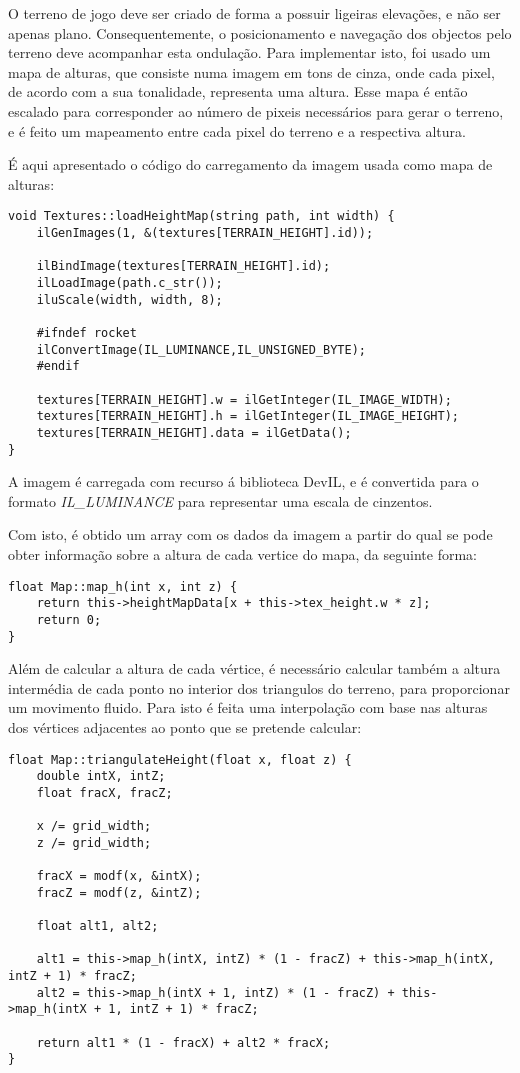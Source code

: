 O terreno de jogo deve ser criado de forma a possuir ligeiras elevações, e não ser apenas plano. Consequentemente, o posicionamento e navegação dos objectos pelo terreno deve acompanhar esta ondulação. Para implementar isto, foi usado um mapa de alturas, que consiste numa imagem em tons de cinza, onde cada pixel, de acordo com a sua tonalidade, representa uma altura.
Esse mapa é então escalado para corresponder ao número de pixeis necessários para gerar o terreno, e é feito um mapeamento entre cada pixel do terreno e a respectiva altura.

É aqui apresentado o código do carregamento da imagem usada como mapa de alturas:

\begin{lstlisting}
void Textures::loadHeightMap(string path, int width) {
	ilGenImages(1, &(textures[TERRAIN_HEIGHT].id));

	ilBindImage(textures[TERRAIN_HEIGHT].id);
	ilLoadImage(path.c_str());
	iluScale(width, width, 8);

	#ifndef rocket
	ilConvertImage(IL_LUMINANCE,IL_UNSIGNED_BYTE);
	#endif
	
	textures[TERRAIN_HEIGHT].w = ilGetInteger(IL_IMAGE_WIDTH);
	textures[TERRAIN_HEIGHT].h = ilGetInteger(IL_IMAGE_HEIGHT);
	textures[TERRAIN_HEIGHT].data = ilGetData();
}
\end{lstlisting}

A imagem é carregada com recurso á biblioteca DevIL, e é convertida para o formato \emph{IL\_LUMINANCE} para representar uma escala de cinzentos.

Com isto, é obtido um array com os dados da imagem a partir do qual se pode obter informação sobre a altura de cada vertice do mapa, da seguinte forma:

\begin{lstlisting}[caption=Função de cálculo da altura de um vértice do mapa]
float Map::map_h(int x, int z) {
	return this->heightMapData[x + this->tex_height.w * z];
	return 0;
}
\end{lstlisting}

Além de calcular a altura de cada vértice, é necessário calcular também a altura intermédia de cada ponto no interior dos triangulos do terreno, para proporcionar um movimento fluido. Para isto é feita uma interpolação com base nas alturas dos vértices adjacentes ao ponto que se pretende calcular:

\begin{lstlisting}[caption=Interpolação da altura de um ponto]
float Map::triangulateHeight(float x, float z) {
	double intX, intZ;
	float fracX, fracZ;

	x /= grid_width;
	z /= grid_width;

	fracX = modf(x, &intX);
	fracZ = modf(z, &intZ);

	float alt1, alt2;

	alt1 = this->map_h(intX, intZ) * (1 - fracZ) + this->map_h(intX, intZ + 1) * fracZ;
	alt2 = this->map_h(intX + 1, intZ) * (1 - fracZ) + this->map_h(intX + 1, intZ + 1) * fracZ;

	return alt1 * (1 - fracX) + alt2 * fracX;
}
\end{lstlisting}

